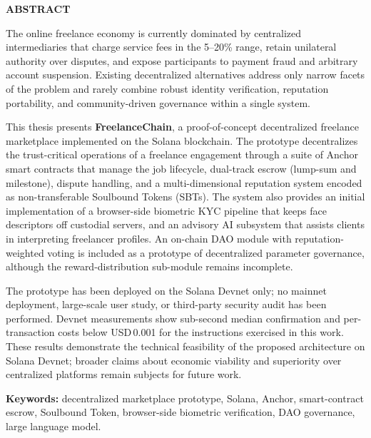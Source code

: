 \begin{center}
{\Large \textbf{ABSTRACT}}
\end{center}
\vspace{0.5cm}

The online freelance economy is currently dominated by centralized intermediaries that charge service fees in the 5--20\% range, retain unilateral authority over disputes, and expose participants to payment fraud and arbitrary account suspension. Existing decentralized alternatives address only narrow facets of the problem and rarely combine robust identity verification, reputation portability, and community-driven governance within a single system.

This thesis presents \textbf{FreelanceChain}, a proof-of-concept decentralized freelance marketplace implemented on the Solana blockchain. The prototype decentralizes the trust-critical operations of a freelance engagement through a suite of Anchor smart contracts that manage the job lifecycle, dual-track escrow (lump-sum and milestone), dispute handling, and a multi-dimensional reputation system encoded as non-transferable Soulbound Tokens (SBTs). The system also provides an initial implementation of a browser-side biometric KYC pipeline that keeps face descriptors off custodial servers, and an advisory AI subsystem that assists clients in interpreting freelancer profiles. An on-chain DAO module with reputation-weighted voting is included as a prototype of decentralized parameter governance, although the reward-distribution sub-module remains incomplete.

The prototype has been deployed on the Solana Devnet only; no mainnet deployment, large-scale user study, or third-party security audit has been performed. Devnet measurements show sub-second median confirmation and per-transaction costs below USD\,0.001 for the instructions exercised in this work. These results demonstrate the technical feasibility of the proposed architecture on Solana Devnet; broader claims about economic viability and superiority over centralized platforms remain subjects for future work.

\vspace{0.2cm}
\noindent\textbf{Keywords:} decentralized marketplace prototype, Solana, Anchor, smart-contract escrow, Soulbound Token, browser-side biometric verification, DAO governance, large language model.
